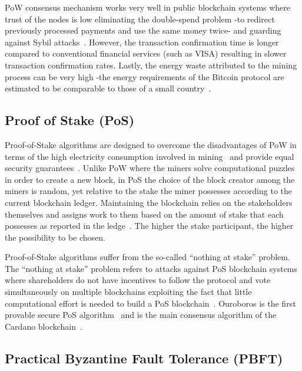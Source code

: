 PoW consensus mechanism works very well in public blockchain systems where trust of the nodes is low eliminating
the double-spend problem -to redirect previously processed payments and use the same money twice- and guarding against Sybil attacks~\cite{Vu:2009:PCP:1671222}.
However, the transaction confirmation time is longer compared to conventional financial services (such as VISA)\cite{Sompolinsky2015,Zohar:2015:BUH:2817191.2701411,DBLP:journals/corr/abs-1708-05665} resulting
in slower transaction confirmation rates. Lastly, the energy waste attributed to the mining process can be very high -the energy requirements
of the Bitcoin protocol are estimated to be comparable to those of a small country~\cite{6912770}.

\subsection{Proof of Stake (PoS)}\label{bltech:consensus:pos}

Proof-of-Stake algorithms are designed to overcome the disadvantages of PoW in terms of the high electricity consumption involved in mining~\cite{bl_consensus}
and provide equal security guarantees~\cite{Kiayias2017}. Unlike PoW where the miners solve computational puzzles in order to create a new block, in PoS the choice
of the block creator among the miners is random, yet relative to the stake the miner possesses according to the current blockchain ledger. Maintaining
the blockchain relies on the stakeholders themselves and assigns work to them based on the amount of stake that each possesses as reported in the ledge~\cite{Kiayias2017}.
The higher the stake participant, the higher the possibility to be chosen.

Proof-of-Stake algorithms suffer from the so-called “nothing at stake” problem.
The “nothing at stake” problem refers to attacks against PoS blockchain systems where shareholders do not have
incentives to follow the protocol and vote simultaneously on multiple blockchains exploiting the fact that little computational effort
is needed to build a PoS blockchain~\cite{Kiayias2017}. Ouroboros is the first provable secure PoS algorithm~\cite{Kiayias2017} and is the main consensus algorithm of the Cardano blockchain~\cite{cardano_site}.

\subsection{Practical Byzantine Fault Tolerance (PBFT)}\label{bltech:consensus:PBFT}

